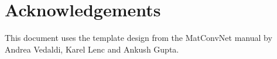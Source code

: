 \section{Acknowledgements}

This document uses the template design from the MatConvNet manual by Andrea Vedaldi, Karel Lenc and Ankush Gupta.